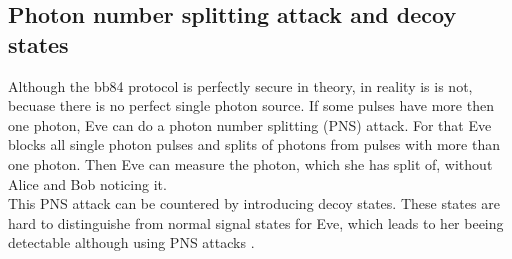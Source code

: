 \subsection{Photon number splitting attack and decoy states}
Although the bb84 protocol is perfectly secure in theory, in reality is is not, becuase there is no perfect single photon source. 
If some pulses have more then one photon, Eve can do a photon number splitting (PNS) attack. 
For that Eve blocks all single photon pulses and splits of photons from pulses with more than one photon. 
Then Eve can measure the photon, which she has split of, without Alice and Bob noticing it.
\\ 
This PNS attack can be countered by introducing decoy states. 
These states are hard to distinguishe from normal signal states for Eve, which leads to her beeing detectable although using PNS attacks \cite{riggs_2022}.



